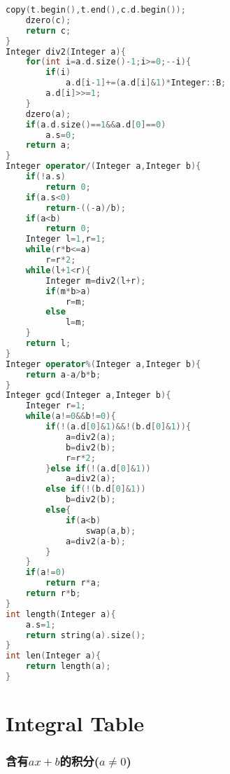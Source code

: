 \documentclass{book}
\begin{document}
\begin{lstlisting}[language=C++,title={Integer.hpp (6378 bytes, 269 lines)}]
    copy(t.begin(),t.end(),c.d.begin());
    dzero(c);
    return c;
}
Integer div2(Integer a){
    for(int i=a.d.size()-1;i>=0;--i){
        if(i)
            a.d[i-1]+=(a.d[i]&1)*Integer::B;
        a.d[i]>>=1;
    }
    dzero(a);
    if(a.d.size()==1&&a.d[0]==0)
        a.s=0;
    return a;
}
Integer operator/(Integer a,Integer b){
    if(!a.s)
        return 0;
    if(a.s<0)
        return-((-a)/b);
    if(a<b)
        return 0;
    Integer l=1,r=1;
    while(r*b<=a)
        r=r*2;
    while(l+1<r){
        Integer m=div2(l+r);
        if(m*b>a)
            r=m;
        else
            l=m;
    }
    return l;
}
Integer operator%(Integer a,Integer b){
    return a-a/b*b;
}
Integer gcd(Integer a,Integer b){
    Integer r=1;
    while(a!=0&&b!=0){
        if(!(a.d[0]&1)&&!(b.d[0]&1)){
            a=div2(a);
            b=div2(b);
            r=r*2;
        }else if(!(a.d[0]&1))
            a=div2(a);
        else if(!(b.d[0]&1))
            b=div2(b);
        else{
            if(a<b)
                swap(a,b);
            a=div2(a-b);
        }
    }
    if(a!=0)
        return r*a;
    return r*b;
}
int length(Integer a){
    a.s=1;
    return string(a).size();
}
int len(Integer a){
    return length(a);
}
\end{lstlisting}
\section{Integral Table}
\subsubsection{含有$ax+b$的积分($a \neq 0$)}
\end{document}
